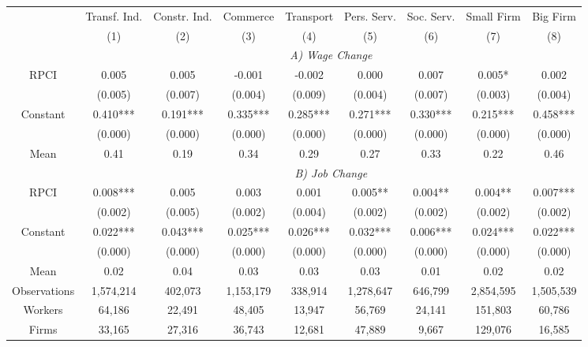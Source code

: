 \begin{tabular}{ccccccccc}
\toprule
\toprule
      & Transf. Ind. & Constr. Ind. & Commerce & Transport & Pers. Serv. & Soc. Serv. & Small Firm & Big Firm \\
      & (1)   & (2)   & (3)   & (4)   & (5)   & (6)   & (7)   & (8) \\
\cmidrule{2-9}      & \multicolumn{8}{c}{\textit{A) Wage Change}} \\
\midrule
RPCI  & 0.005 & 0.005 & -0.001 & -0.002 & 0.000 & 0.007 & 0.005* & 0.002 \\
      & (0.005) & (0.007) & (0.004) & (0.009) & (0.004) & (0.007) & (0.003) & (0.004) \\
Constant & 0.410*** & 0.191*** & 0.335*** & 0.285*** & 0.271*** & 0.330*** & 0.215*** & 0.458*** \\
      & (0.000) & (0.000) & (0.000) & (0.000) & (0.000) & (0.000) & (0.000) & (0.000) \\
Mean  & 0.41  & 0.19  & 0.34  & 0.29  & 0.27  & 0.33  & 0.22  & 0.46 \\
\cmidrule{2-9}      & \multicolumn{8}{c}{\textit{B) Job Change}} \\
\midrule
RPCI  & 0.008*** & 0.005 & 0.003 & 0.001 & 0.005** & 0.004** & 0.004** & 0.007*** \\
      & (0.002) & (0.005) & (0.002) & (0.004) & (0.002) & (0.002) & (0.002) & (0.002) \\
Constant & 0.022*** & 0.043*** & 0.025*** & 0.026*** & 0.032*** & 0.006*** & 0.024*** & 0.022*** \\
      & (0.000) & (0.000) & (0.000) & (0.000) & (0.000) & (0.000) & (0.000) & (0.000) \\
Mean  & 0.02  & 0.04  & 0.03  & 0.03  & 0.03  & 0.01  & 0.02  & 0.02 \\
\midrule
Observations & 1,574,214 & 402,073 & 1,153,179 & 338,914 & 1,278,647 & 646,799 & 2,854,595 & 1,505,539 \\
Workers & 64,186 & 22,491 & 48,405 & 13,947 & 56,769 & 24,141 & 151,803 & 60,786 \\
Firms & 33,165 & 27,316 & 36,743 & 12,681 & 47,889 & 9,667 & 129,076 & 16,585 \\
\bottomrule
\bottomrule
\end{tabular}%
